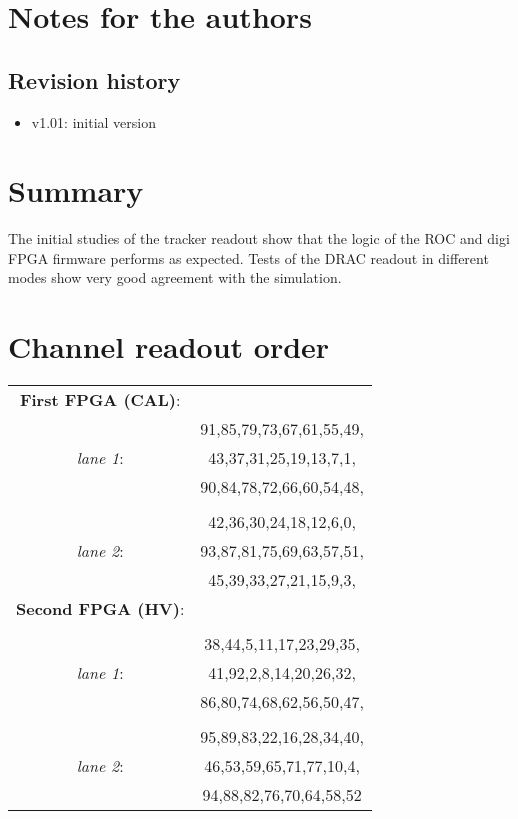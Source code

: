 \documentclass[12pt]{article}
\begin{document}
\section {Notes for the authors}
\subsection {Revision history} 
\begin{itemize}
\item
  v1.01: initial version
\end{itemize}



% 
\newpage
\section{Summary}
The initial studies of the tracker readout show that the logic of the ROC and digi FPGA
firmware performs as expected. Tests of the DRAC readout in different modes show very good 
agreement with the simulation.
%
\newpage
\appendix\label{order}
\section{Channel readout order}
\begin{center}
\begin{tabular}{cc}
\textbf{First FPGA (CAL)}: & \\
&91,85,79,73,67,61,55,49,\\
\textit{lane 1}: &43,37,31,25,19,13,7,1,\\
&90,84,78,72,66,60,54,48,\\
& \\
&42,36,30,24,18,12,6,0,\\
\textit{lane 2}: &93,87,81,75,69,63,57,51,\\
&45,39,33,27,21,15,9,3,\\
\textbf{Second FPGA (HV)}:&\\
&\\
&38,44,5,11,17,23,29,35,\\
\textit{lane 1}:&41,92,2,8,14,20,26,32,\\
&86,80,74,68,62,56,50,47,\\
 & \\
&95,89,83,22,16,28,34,40,\\
\textit{lane 2}:&46,53,59,65,71,77,10,4,\\
&94,88,82,76,70,64,58,52\\
\end{tabular}
\end{center}   


\end{document}

